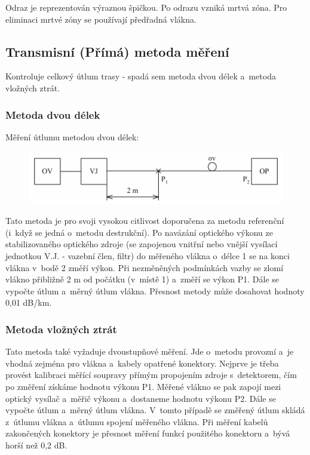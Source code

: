 Odraz je reprezentován výraznou špičkou. Po odrazu vzniká mrtvá zóna. Pro eliminaci mrtvé zóny se používají předřadná vlákna.

\subsection{Transmisní (Přímá) metoda měření}
Kontroluje celkový útlum trasy - spadá sem metoda dvou délek a~metoda vložných ztrát.

\subsubsection{Metoda dvou délek}
Měření útlumu metodou dvou délek:

\begin{figure}[!ht]
  \begin{center}
    \includegraphics[scale=1]{obrazky/dvedel.png}
  \end{center}
\end{figure}
Tato metoda je pro svoji vysokou citlivost doporučena za metodu referenční (i~když se jedná o~metodu destrukční). Po navázání optického výkonu ze stabilizovaného optického zdroje (se zapojenou vnitřní nebo vnější vysílací jednotkou V.J. - vazební člen, filtr) do měřeného vlákna o~délce 1 se na konci vlákna v~bodě 2 změří výkon. Při nezměněných podmínkách vazby se zlomí vlákno přibližně 2 m od počátku (v~místě 1) a~změří se výkon P1. Dále se vypočte útlum a~měrný útlum vlákna. Přesnost metody může dosahovat hodnoty 0,01 dB/km.

\subsubsection{Metoda vložných ztrát}
Tato metoda také vyžaduje dvoustupňové měření. Jde o~metodu provozní a~je vhodná zejména pro vlákna a~kabely opatřené konektory. Nejprve je třeba provést kalibraci měřící soupravy přímým propojením zdroje s~detektorem, čím po změření získáme hodnotu výkonu P1. Měřené vlákno se pak zapojí mezi optický vysílač a~měřič výkonu a~dostaneme hodnotu výkonu P2. Dále se vypočte útlum a~měrný útlum vlákna. V~tomto případě se změřený útlum skládá z~útlumu vlákna a~útlumu spojení měřeného vlákna. Při měření kabelů zakončených konektory je přesnost měření funkcí použitého konektoru a~bývá horší než 0,2 dB.

